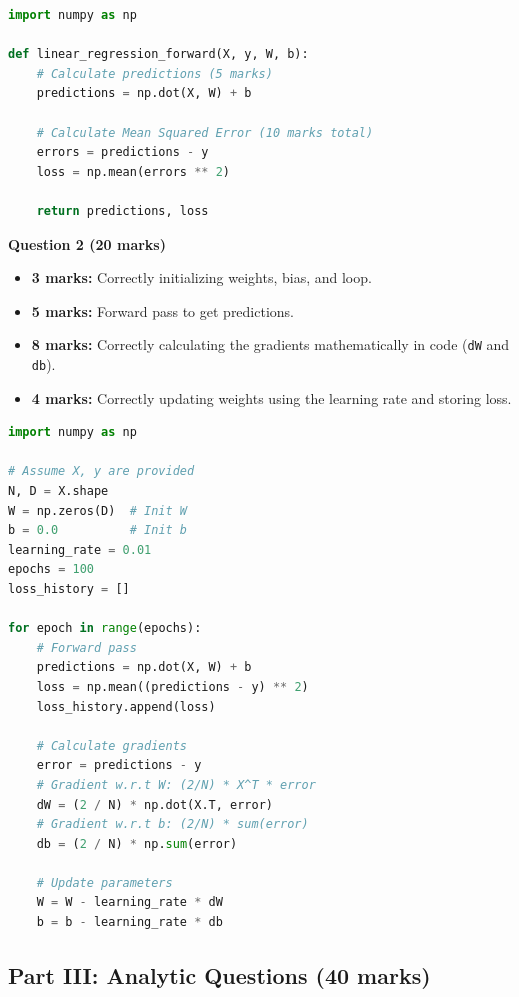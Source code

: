 \documentclass[11pt]{article}
\begin{document}
\begin{lstlisting}[language=Python]
import numpy as np

def linear_regression_forward(X, y, W, b):
    # Calculate predictions (5 marks)
    predictions = np.dot(X, W) + b
    
    # Calculate Mean Squared Error (10 marks total)
    errors = predictions - y
    loss = np.mean(errors ** 2)
    
    return predictions, loss
\end{lstlisting}

\textbf{Question 2 (20 marks)}
\begin{itemize}
    \item \textbf{3 marks:} Correctly initializing weights, bias, and loop.
    \item \textbf{5 marks:} Forward pass to get predictions.
    \item \textbf{8 marks:} Correctly calculating the gradients mathematically in code (\texttt{dW} and \texttt{db}).
    \item \textbf{4 marks:} Correctly updating weights using the learning rate and storing loss.
\end{itemize}

\begin{lstlisting}[language=Python]
import numpy as np

# Assume X, y are provided
N, D = X.shape
W = np.zeros(D)  # Init W
b = 0.0          # Init b
learning_rate = 0.01
epochs = 100
loss_history = []

for epoch in range(epochs):
    # Forward pass
    predictions = np.dot(X, W) + b
    loss = np.mean((predictions - y) ** 2)
    loss_history.append(loss)
    
    # Calculate gradients
    error = predictions - y
    # Gradient w.r.t W: (2/N) * X^T * error
    dW = (2 / N) * np.dot(X.T, error) 
    # Gradient w.r.t b: (2/N) * sum(error)
    db = (2 / N) * np.sum(error)
    
    # Update parameters
    W = W - learning_rate * dW
    b = b - learning_rate * db
\end{lstlisting}

\subsection*{Part III: Analytic Questions (40 marks)}
\end{document}
